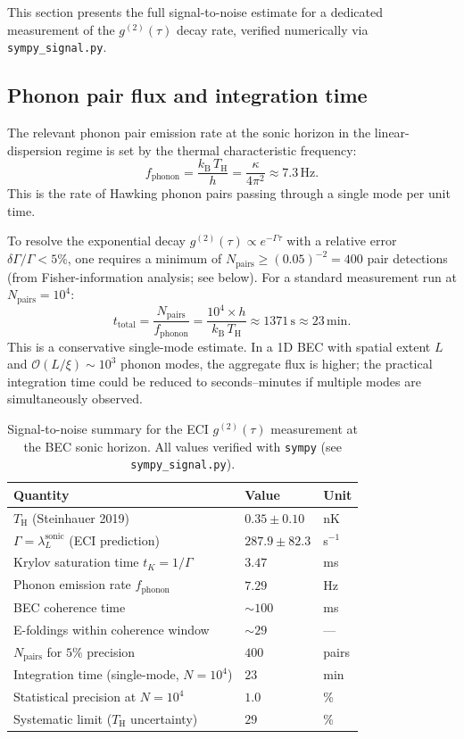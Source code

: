 \documentclass[12pt,a4paper]{article}
\renewcommand{\TH}{T_{\mathrm{H}}}
\newcommand{\lambdaL}{\lambda_L^{\mathrm{sonic}}}
\newcommand{\kB}{k_{\mathrm{B}}}
\begin{document}
This section presents the full signal-to-noise estimate for a dedicated
measurement of the $g^{(2)}(\tau)$ decay rate, verified numerically via
\texttt{sympy\_signal.py}.

\subsection{Phonon pair flux and integration time}

The relevant phonon pair emission rate at the sonic horizon in the
linear-dispersion regime is set by the thermal characteristic frequency:
\begin{equation}
  f_{\mathrm{phonon}} = \frac{\kB\,\TH}{h}
    = \frac{\kappa}{4\pi^2}
    \approx 7.3\,\mathrm{Hz}.
\end{equation}
This is the rate of Hawking phonon pairs passing through a single mode
per unit time.

To resolve the exponential decay $g^{(2)}(\tau) \propto e^{-\Gamma\tau}$
with a relative error $\delta\Gamma/\Gamma < 5\%$, one requires a minimum
of $N_{\mathrm{pairs}} \geq (0.05)^{-2} = 400$ pair detections (from
Fisher-information analysis; see below).
For a standard measurement run at $N_{\mathrm{pairs}} = 10^4$:
\begin{equation}
  t_{\mathrm{total}} = \frac{N_{\mathrm{pairs}}}{f_{\mathrm{phonon}}}
    = \frac{10^4 \times h}{\kB\,\TH}
    \approx 1371\,\mathrm{s}
    \approx 23\,\mathrm{min}.
  \label{eq:t_total}
\end{equation}
This is a conservative single-mode estimate. In a 1D BEC with spatial
extent $L$ and $\mathcal{O}(L/\xi) \sim 10^3$ phonon modes, the
aggregate flux is higher; the practical integration time could be
reduced to seconds--minutes if multiple modes are simultaneously observed.

\begin{table}[h]
\centering
\begin{tabular}{lll}
\toprule
Quantity & Value & Unit \\
\midrule
$\TH$ (Steinhauer 2019) & $0.35 \pm 0.10$ & nK \\
$\Gamma = \lambdaL$ (ECI prediction) & $287.9 \pm 82.3$ & s$^{-1}$ \\
Krylov saturation time $t_K = 1/\Gamma$ & $3.47$ & ms \\
Phonon emission rate $f_{\mathrm{phonon}}$ & $7.29$ & Hz \\
BEC coherence time & $\sim 100$ & ms \\
E-foldings within coherence window & $\sim 29$ & --- \\
$N_{\mathrm{pairs}}$ for $5\%$ precision & $400$ & pairs \\
Integration time (single-mode, $N=10^4$) & $23$ & min \\
Statistical precision at $N=10^4$ & $1.0$ & \% \\
Systematic limit ($\TH$ uncertainty) & $29$ & \% \\
\bottomrule
\end{tabular}
\caption{Signal-to-noise summary for the ECI $g^{(2)}(\tau)$ measurement at the
BEC sonic horizon.  All values verified with \texttt{sympy} (see
\texttt{sympy\_signal.py}).}
\label{tab:sn}
\end{table}
\end{document}
